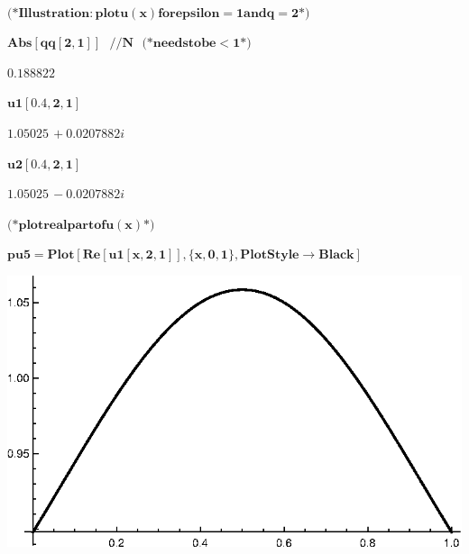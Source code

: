 {\begin{doublespace}
\noindent\(\pmb{\text{}}\)
\end{doublespace}

\begin{doublespace}
\noindent\(\pmb{\text{(*} \text{Illustration}: \text{plot} u(x) \text{for} \text{epsilon} = 1 \text{and} q=2 \text{*)}}\)
\end{doublespace}

\begin{doublespace}
\noindent\(\pmb{\text{Abs}[\text{qq}[2,1]]\text{  }\text{//}N\text{   }\text{(*} \text{needs} \text{to} \text{be} <1 \text{*)}}\)
\end{doublespace}

\begin{doublespace}
\noindent\(0.188822\)
\end{doublespace}

\begin{doublespace}
\noindent\(\pmb{\text{u1}[0.4,2,1]}\)
\end{doublespace}

\begin{doublespace}
\noindent\(1.05025\, +0.0207882 i\)
\end{doublespace}

\begin{doublespace}
\noindent\(\pmb{\text{u2}[0.4,2,1]}\)
\end{doublespace}

\begin{doublespace}
\noindent\(1.05025\, -0.0207882 i\)
\end{doublespace}

\begin{doublespace}
\noindent\(\pmb{\text{(*} \text{plot} \text{real} \text{part} \text{of} u(x) \text{*)}}\)
\end{doublespace}

\begin{doublespace}
\noindent\(\pmb{\text{pu5}=\text{Plot}[\text{Re}[\text{u1}[x,2,1]],\{x,0,1\},\text{PlotStyle}\to \text{Black}]}\)
\end{doublespace}

\includegraphics{chapters/appendices/KP_Mathematica/Kronig_Penney_model_transfer_matrix_gr14.eps}

}
